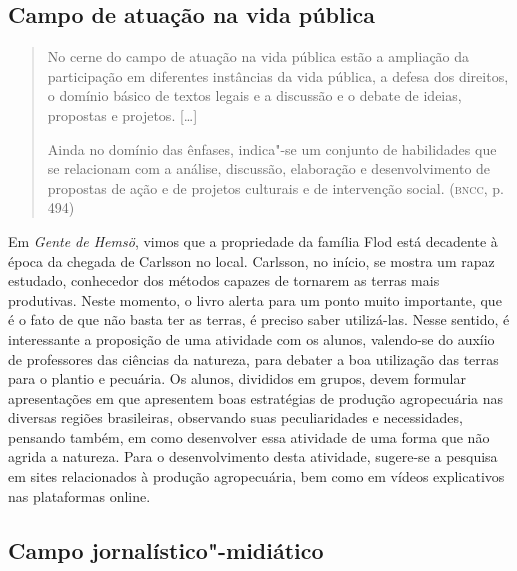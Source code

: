 \documentclass[12pt]{extarticle}
\begin{document}
\subsection{Campo de atuação na vida pública}

\begin{quote}
No cerne do campo de atuação na vida pública estão a ampliação da
participação em diferentes instâncias da vida pública, a defesa dos
direitos, o domínio básico de textos legais e a discussão e o debate de
ideias, propostas e projetos. {[}\ldots{}{]}

Ainda no domínio das ênfases, indica"-se um conjunto de habilidades que
se relacionam com a análise, discussão, elaboração e desenvolvimento de
propostas de ação e de projetos culturais e de intervenção social.
(\textsc{bncc}, p. 494)
\end{quote}

Em \emph{Gente de Hemsö}, vimos que a propriedade da família Flod está
decadente à época da chegada de Carlsson no local. Carlsson, no
início, se mostra um rapaz estudado, conhecedor dos métodos capazes de
tornarem as terras mais produtivas. Neste momento, o livro alerta para
um ponto muito importante, que é o fato de que não basta ter as
terras, é preciso saber utilizá-las. Nesse sentido, é interessante a
proposição de uma atividade com os alunos, valendo-se do auxíio de
professores das ciências da natureza, para debater a boa utilização
das terras para o plantio e pecuária. Os alunos, divididos em grupos,
devem formular apresentações em que apresentem boas estratégias de
produção agropecuária nas diversas regiões brasileiras, observando
suas peculiaridades e necessidades, pensando também, em como
desenvolver essa atividade de uma forma que não agrida a natureza.
Para o desenvolvimento desta atividade, sugere-se a pesquisa em sites
relacionados à produção agropecuária, bem como em vídeos explicativos
nas plataformas online.

\subsection{Campo jornalístico"-midiático}
\end{document}
